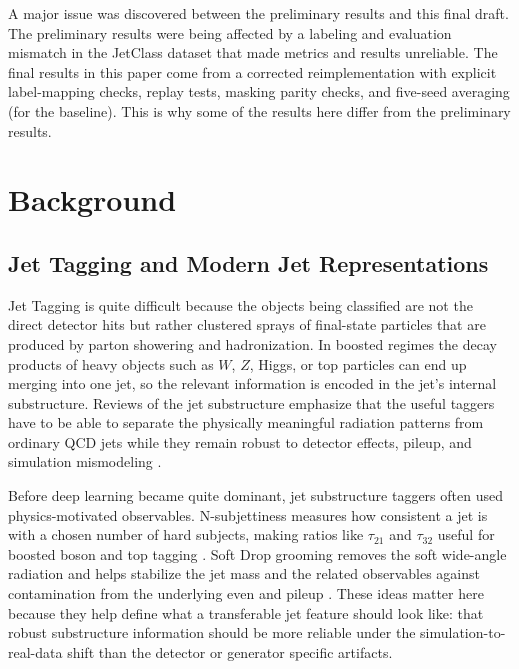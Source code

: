 \documentclass[11pt]{article}
\begin{document}
A major issue was discovered between the preliminary results and this final draft. The preliminary results were being affected by a labeling and evaluation mismatch in the JetClass dataset that made metrics and results unreliable. The final results in this paper come from a corrected reimplementation with explicit label-mapping checks, replay tests, masking parity checks, and five-seed averaging (for the baseline). This is why some of the results here differ from the preliminary results.





\section{Background}

\subsection{Jet Tagging and Modern Jet Representations}

Jet Tagging is quite difficult because the objects being classified are not the direct detector hits but rather clustered sprays of final-state particles that are produced by parton showering and hadronization. In boosted regimes the decay products of heavy objects such as $W$, $Z$, Higgs, or top particles can end up merging into one jet, so the relevant information is encoded in the jet’s internal substructure. Reviews of the jet substructure emphasize that the useful taggers have to be able to separate the physically meaningful radiation patterns from ordinary QCD jets while they remain robust to detector effects, pileup, and simulation mismodeling \cite{larkoski2017jet,kogler2019jet}.

Before deep learning became quite dominant, jet substructure taggers often used physics-motivated observables. N-subjettiness measures how consistent a jet is with a chosen number of hard subjects, making ratios like $\tau_{21}$ and $\tau_{32}$ useful for boosted boson and top tagging \cite{thaler2011nsubjettiness,thaler2012nsubjettiness}. Soft Drop grooming removes the soft wide-angle radiation and helps stabilize the jet mass and the related observables against contamination from the underlying even and pileup  \cite{larkoski2014softdrop}. These ideas matter here because they help define what a transferable jet feature should look like: that robust substructure information should be more reliable under the simulation-to-real-data shift than the detector or generator specific artifacts.
\end{document}
